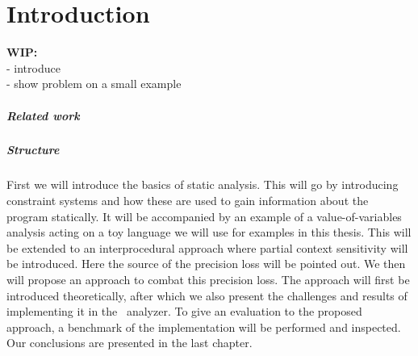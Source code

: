 
\chapter{Introduction}\label{chapter:introduction}
  \textbf{WIP:}\\
  - introduce \gob\\
  - show problem on a small example

\paragraph{Related work}

\paragraph{Structure} 
First we will introduce the basics of static analysis. This will go by introducing constraint systems and how these are used to gain information about the program statically. It will be accompanied by an example of a value-of-variables analysis acting on a toy language we will use for examples in this thesis. This will be extended to an interprocedural approach where partial context sensitivity will be introduced. Here the source of the precision loss will be pointed out. We then will propose an approach to combat this precision loss. The approach will first be introduced theoretically, after which we also present the challenges and results of implementing it in the \gob\ analyzer. To give an evaluation to the proposed approach, a benchmark of the implementation will be performed and inspected. Our conclusions are presented in the last chapter.
